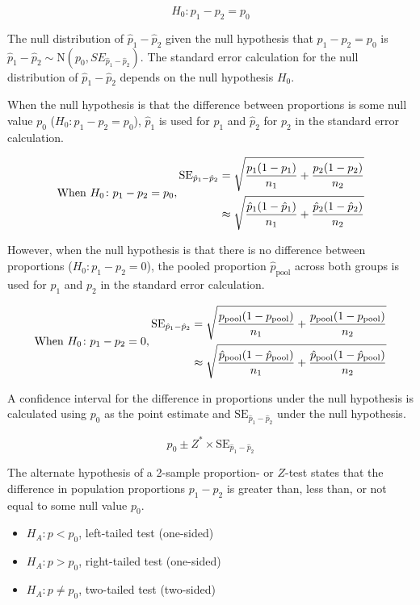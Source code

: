 \documentclass[
  letterpaper,
  DIV=11,
  numbers=noendperiod]{scrartcl}
\begin{document}
\[
H_0 \colon p_1-p_2=p_0
\]

The null distribution of \(\hat{p}_1-\hat{p}_2\) given the null
hypothesis that \(p_1-p_2=p_0\) is
\(\hat{p}_1-\hat{p}_2 \sim \text{N}\left(p_0, SE_{\hat{p}_1-\hat{p}_2}\right)\).
The standard error calculation for the null distribution of
\(\hat{p}_1-\hat{p}_2\) depends on the null hypothesis \(H_0\).

When the null hypothesis is that the difference between proportions is
some null value \(p_0\) (\(H_0 \colon p_1-p_2=p_0\)), \(\hat{p}_1\) is
used for \(p_1\) and \(\hat{p}_2\) for \(p_2\) in the standard error
calculation.

\[
\text{When } H_0 \colon p_1-p_2=p_0, \\
\begin{aligned}
\text{SE}_{\hat{p}_1-\hat{p}_2}&= \sqrt{\frac{p_1(1-p_1)}{n_1}+\frac{p_2(1-p_2)}{n_2}} \\
&\approx \sqrt{\frac{\hat{p}_1(1-\hat{p}_1)}{n_1}+\frac{\hat{p}_2(1-\hat{p}_2)}{n_2}}
\end{aligned}
\]

However, when the null hypothesis is that there is no difference between
proportions (\(H_0 \colon p_1-p_2=0\)), the pooled proportion
\(\hat{p}_{\text{pool}}\) across both groups is used for \(p_1\) and
\(p_2\) in the standard error calculation.

\[
\text{When } H_0 \colon p_1-p_2=0, \\
\begin{aligned}
\text{SE}_{\hat{p}_1-\hat{p}_2}&= \sqrt{\frac{p_{\text{pool}}(1-p_{\text{pool}})}{n_1}+\frac{p_{\text{pool}}(1-p_{\text{pool}})}{n_2}} \\
&\approx \sqrt{\frac{\hat{p}_{\text{pool}}(1-\hat{p}_{\text{pool}})}{n_1}+\frac{\hat{p}_{\text{pool}}(1-\hat{p}_{\text{pool}})}{n_2}}
\end{aligned}
\]

A confidence interval for the difference in proportions under the null
hypothesis is calculated using \(p_0\) as the point estimate and
\(\text{SE}_{\hat{p}_1-\hat{p}_2}\) under the null hypothesis.

\[
p_0 \pm Z^* \times \text{SE}_{\hat{p}_1-\hat{p}_2}
\]

The alternate hypothesis of a 2-sample proportion- or \(Z\)-test states
that the difference in population proportions \(p_1-p_2\) is greater
than, less than, or not equal to some null value \(p_0\).

\begin{itemize}
\item
  \(H_A \colon p < p_0\), left-tailed test (one-sided)
\item
  \(H_A \colon p > p_0\), right-tailed test (one-sided)
\item
  \(H_A \colon p \ne p_0\), two-tailed test (two-sided)
\end{itemize}
\end{document}
